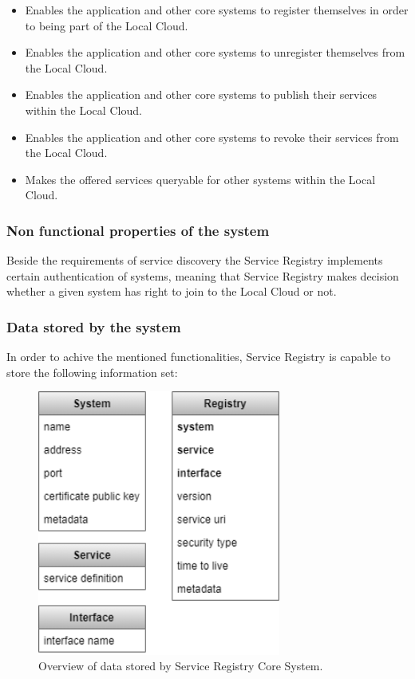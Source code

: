 \documentclass[a4paper]{arrowhead}
\begin{document}
\begin{itemize}
    \item Enables the application and other core systems to register themselves in order to being part of the Local Cloud.
    \item Enables the application and other core systems to unregister themselves from the Local Cloud.
    \item Enables the application and other core systems to publish their services within the Local Cloud.
    \item Enables the application and other core systems to revoke their services from the Local Cloud.
    \item Makes the offered services queryable for other systems within the Local Cloud.
\end{itemize}

\subsubsection {Non functional properties of the system}
Beside the requirements of service discovery the Service Registry implements certain authentication of systems, meaning that Service Registry makes decision whether a given system has right to join to the Local Cloud or not.

\subsubsection {Data stored by the system}
In order to achive the mentioned functionalities, Service Registry is capable to store the following information set:

\begin{figure}[h!]
  \centering
  \includegraphics[width=8cm]{figures/serviceregistry_data_overview.png}
  \caption{
    Overview of data stored by Service Registry Core System.
  }
  \label{fig:model_overview}
\end{figure}
\end{document}

